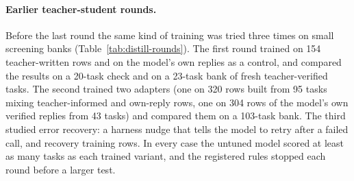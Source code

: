 \paragraph{Earlier teacher-student rounds.} Before the last round the same kind of training was tried three times on small screening banks (Table~\ref{tab:distill-rounds}). The first round trained on 154 teacher-written rows and on the model's own replies as a control, and compared the results on a 20-task check and on a 23-task bank of fresh teacher-verified tasks. The second trained two adapters (one on 320 rows built from 95 tasks mixing teacher-informed and own-reply rows, one on 304 rows of the model's own verified replies from 43 tasks) and compared them on a 103-task bank. The third studied error recovery: a harness nudge that tells the model to retry after a failed call, and recovery training rows. In every case the untuned model scored at least as many tasks as each trained variant, and the registered rules stopped each round before a larger test.

